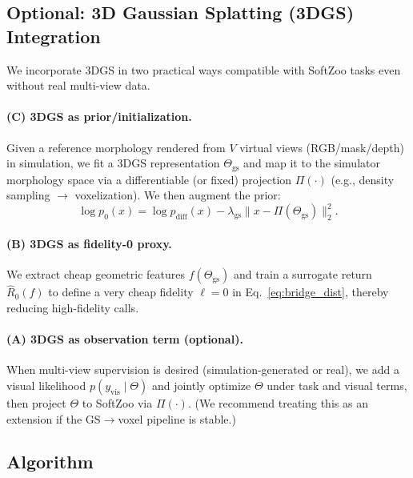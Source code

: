 \subsection{Optional: 3D Gaussian Splatting (3DGS) Integration}
\label{subsec:3dgs}

We incorporate 3DGS in two practical ways compatible with SoftZoo tasks even without real multi-view data.

\paragraph{(C) 3DGS as prior/initialization.}
Given a reference morphology rendered from $V$ virtual views (RGB/mask/depth) in simulation,
we fit a 3DGS representation $\Theta_{\mathrm{gs}}$ and map it to the simulator morphology space via
a differentiable (or fixed) projection $\Pi(\cdot)$ (e.g., density sampling $\to$ voxelization).
We then augment the prior:
\begin{equation}
\log p_0(x)
=
\log p_{\mathrm{diff}}(x)
-\lambda_{\mathrm{gs}}\|x-\Pi(\Theta_{\mathrm{gs}})\|_2^2.
\label{eq:3dgs_prior}
\end{equation}

\paragraph{(B) 3DGS as fidelity-0 proxy.}
We extract cheap geometric features $f(\Theta_{\mathrm{gs}})$ and train a surrogate return
$\widehat{R}_0(f)$ to define a very cheap fidelity $\ell=0$ in Eq.~\eqref{eq:bridge_dist},
thereby reducing high-fidelity calls.

\paragraph{(A) 3DGS as observation term (optional).}
When multi-view supervision is desired (simulation-generated or real),
we add a visual likelihood $p(y_{\mathrm{vis}}\mid \Theta)$ and jointly optimize
$\Theta$ under task and visual terms, then project $\Theta$ to SoftZoo via $\Pi(\cdot)$.
(We recommend treating this as an extension if the GS$\to$voxel pipeline is stable.)

\subsection{Algorithm}
\label{subsec:algorithm}

